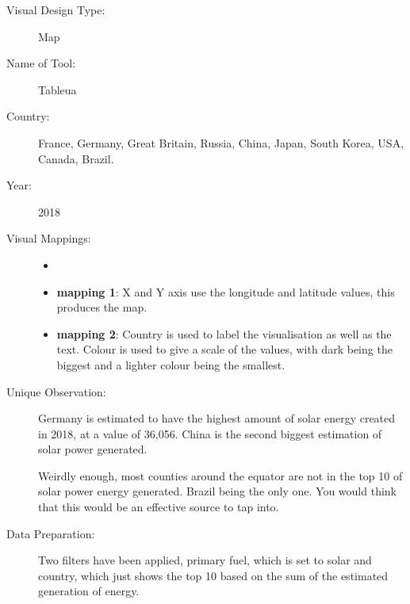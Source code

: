 \begin{description}
\item[Visual Design Type:]
Map
\item[Name of Tool:]
Tableua
\item[Country:]
France, Germany, Great Britain, Russia, China, Japan, South Korea, USA, Canada, Brazil.
\item[Year:]
2018
\item[Visual Mappings:]
\begin{itemize}
	\tightlist
	\item[  ]
\end{itemize}
\begin{itemize}
\tightlist
\item
  \textbf{mapping 1}: X and Y axis use the longitude and latitude values, this produces the map.
\end{itemize}

\begin{itemize}
\tightlist
\item
  \textbf{mapping 2}: Country is used to label the visualisation as well as the text. Colour is used to give a scale of the values, with dark being the biggest and a lighter colour being the smallest.
\end{itemize}
\item[Unique Observation:]
Germany is estimated to have the highest amount of solar energy created in 2018, at a value of 36,056. China is the second biggest estimation of solar power generated.

Weirdly enough, most counties around the equator are not in the top 10 of solar power energy generated. Brazil being the only one. You would think that this would be an effective source to tap into.

\item[Data Preparation:] Two filters have been applied, primary fuel, which is set to solar and country, which just shows the top 10 based on the sum of the estimated generation of energy.
\end{description}  